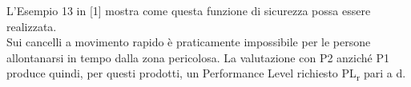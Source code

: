 L'Esempio 13 in [1] mostra come questa funzione di sicurezza possa essere realizzata.\\
Sui cancelli a movimento rapido è praticamente impossibile per le persone allontanarsi in tempo dalla zona pericolosa. La valutazione con P2 anziché P1 produce quindi, per questi prodotti, un Performance Level richiesto PL\textsubscript{r} pari a d.

\begin{center}
    \begin{minipage}{\textwidth}
        \centering
        \captionsetup{hypcap=false}
        \resizebox{0.68\textwidth}{!}{}
        \label{fig:A-01}
    \end{minipage}
\end{center}
\clearpage



